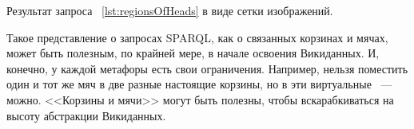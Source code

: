 \begin{marginfigure}[-3.5cm]
	{
		\setlength{\fboxsep}{0pt}%
		\setlength{\fboxrule}{1pt}%
	}
    \caption{Результат запроса ~\ref{lst:regionsOfHeads} в виде сетки изображений.}
	\label{fig:WDQS_drop_down_result_type}
\end{marginfigure}



Такое представление о запросах SPARQL, как о связанных корзинах и мячах, может быть полезным, по крайней мере, в начале освоения Викиданных. И, конечно, у каждой метафоры есть свои ограничения. Например, нельзя поместить один и тот же мяч в две разные настоящие корзины, но в эти виртуальные ~--- можно. <<Корзины и мячи>> могут быть полезны, чтобы вскарабкиваться на высоту абстракции Викиданных.